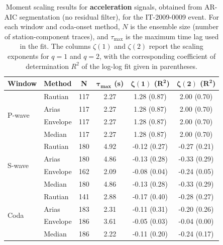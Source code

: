 \begin{table}[H]
\centering
\small
\begin{tabular}{llcccc}
\toprule
\textbf{Window} & \textbf{Method} & \textbf{N} & $\bm{\tau_{\max}}$ \textbf{(s)} & $\bm{\zeta(1)}$ \textbf{(}$\bm{R^2}$\textbf{)} & $\bm{\zeta(2)}$ \textbf{(}$\bm{R^2}$\textbf{)} \\
\midrule
\multirow{4}{*}{P-wave}
& Rautian & 117 & 2.27 & 1.28 (0.87) & 2.00 (0.70) \\
& Arias & 117 & 2.27 & 1.28 (0.87) & 2.00 (0.70) \\
& Envelope & 117 & 2.27 & 1.28 (0.87) & 2.00 (0.70) \\
& Median & 117 & 2.27 & 1.28 (0.87) & 2.00 (0.70) \\
\midrule
\multirow{4}{*}{S-wave}
& Rautian & 180 & 4.92 & -0.12 (0.27) & -0.27 (0.21) \\
& Arias & 180 & 4.86 & -0.13 (0.28) & -0.33 (0.29) \\
& Envelope & 162 & 2.09 & -0.08 (0.04) & -0.24 (0.05) \\
& Median & 180 & 4.86 & -0.13 (0.28) & -0.33 (0.29) \\
\midrule
\multirow{4}{*}{Coda}
& Rautian & 141 & 2.88 & -0.17 (0.40) & -0.28 (0.27) \\
& Arias & 183 & 2.31 & -0.11 (0.31) & -0.20 (0.26) \\
& Envelope & 186 & 3.61 & -0.05 (0.03) & -0.04 (0.00) \\
& Median & 186 & 2.22 & -0.11 (0.20) & -0.24 (0.17) \\
\bottomrule
\end{tabular}
\caption{Moment scaling results for \textbf{acceleration} signals, obtained from AR-AIC segmentation (no residual filter), for the IT-2009-0009 event. For each window and coda-onset method, $N$ is the ensemble size (number of station-component traces), and $\tau_{\max}$ is the maximum time lag used in the fit. The columns $\zeta(1)$ and $\zeta(2)$ report the scaling exponents for $q=1$ and $q=2$, with the corresponding coefficient of determination $R^2$ of the log-log fit given in parentheses.}
\label{tab:ar_aic_scaling_acc_nothresh_laquila}
\end{table}